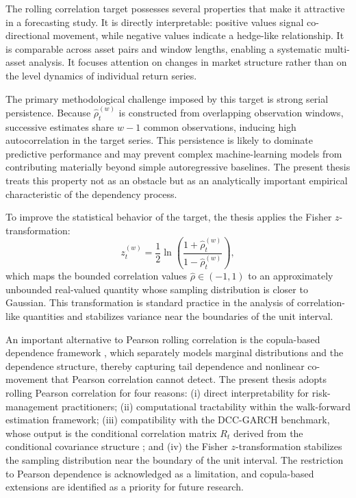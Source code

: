The rolling correlation target possesses several properties that make it attractive in a forecasting study. It is directly interpretable: positive values signal co-directional movement, while negative values indicate a hedge-like relationship. It is comparable across asset pairs and window lengths, enabling a systematic multi-asset analysis. It focuses attention on changes in market structure rather than on the level dynamics of individual return series.

The primary methodological challenge imposed by this target is strong serial persistence. Because $\hat{\rho}_{t}^{(w)}$ is constructed from overlapping observation windows, successive estimates share $w-1$ common observations, inducing high autocorrelation in the target series. This persistence is likely to dominate predictive performance and may prevent complex machine-learning models from contributing materially beyond simple autoregressive baselines. The present thesis treats this property not as an obstacle but as an analytically important empirical characteristic of the dependency process.

To improve the statistical behavior of the target, the thesis applies the Fisher $z$-transformation:
\begin{equation}
    z_{t}^{(w)} = \frac{1}{2}\ln\!\left(\frac{1 + \hat{\rho}_{t}^{(w)}}{1 - \hat{\rho}_{t}^{(w)}}\right),
\end{equation}
which maps the bounded correlation values $\hat{\rho} \in (-1,1)$ to an approximately unbounded real-valued quantity whose sampling distribution is closer to Gaussian. This transformation is standard practice in the analysis of correlation-like quantities and stabilizes variance near the boundaries of the unit interval.

An important alternative to Pearson rolling correlation is the copula-based dependence framework \cite{patton2006copula}, which separately models marginal distributions and the dependence structure, thereby capturing tail dependence and nonlinear co-movement that Pearson correlation cannot detect. The present thesis adopts rolling Pearson correlation for four reasons: (i) direct interpretability for risk-management practitioners; (ii) computational tractability within the walk-forward estimation framework; (iii) compatibility with the DCC-GARCH benchmark, whose output is the conditional correlation matrix $R_t$ derived from the conditional covariance structure \cite{engle2001theoretical}; and (iv) the Fisher $z$-transformation stabilizes the sampling distribution near the boundary of the unit interval. The restriction to Pearson dependence is acknowledged as a limitation, and copula-based extensions are identified as a priority for future research.

